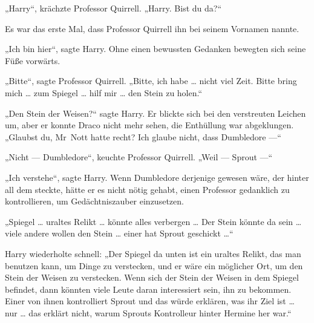 „Harry“, krächzte Professor Quirrell.
„Harry. Bist du da?“

Es war das erste Mal, dass Professor Quirrell ihn bei seinem Vornamen nannte.

„Ich bin hier“, sagte Harry. Ohne einen bewussten Gedanken bewegten sich seine Füße vorwärts.

„Bitte“, sagte Professor Quirrell.
„Bitte, ich habe … nicht viel Zeit. Bitte bring mich … zum Spiegel … hilf mir … den Stein zu holen.“

„Den Stein der Weisen?“ sagte Harry.
Er blickte sich bei den verstreuten Leichen um, aber er konnte Draco nicht mehr sehen, die Enthüllung war abgeklungen.
„Glaubst du, Mr~Nott hatte recht? Ich glaube nicht, dass Dumbledore —“

„Nicht — Dumbledore“, keuchte Professor Quirrell.
„Weil — Sprout —“

„Ich verstehe“, sagte Harry.
Wenn Dumbledore derjenige gewesen wäre, der hinter all dem steckte, hätte er es nicht nötig gehabt, einen Professor gedanklich zu kontrollieren, um Gedächtniszauber einzusetzen.

„Spiegel … uraltes Relikt … könnte alles verbergen … Der Stein könnte da sein … viele andere wollen den Stein … einer hat Sprout geschickt …“

Harry wiederholte schnell:
„Der Spiegel da unten ist ein uraltes Relikt, das man benutzen kann, um Dinge zu verstecken, und er wäre ein möglicher Ort, um den Stein der Weisen zu verstecken. Wenn sich der Stein der Weisen in dem Spiegel befindet, dann könnten viele Leute daran interessiert sein, ihn zu bekommen. Einer von ihnen kontrolliert Sprout und das würde erklären, was ihr Ziel ist … nur … das erklärt nicht, warum Sprouts Kontrolleur hinter Hermine her war.“


